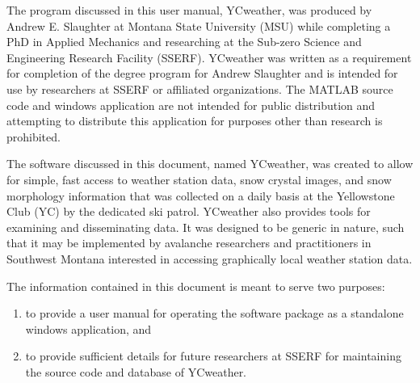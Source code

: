 The program discussed in this user manual, YCweather, was produced by Andrew E. Slaughter at Montana State University (MSU) while completing a PhD in Applied Mechanics and researching at the Sub-zero Science and Engineering Research Facility (SSERF). YCweather was written as a requirement for completion of the degree program for Andrew Slaughter and is intended for use by researchers at SSERF or affiliated organizations. The MATLAB source code and windows application are not intended for public distribution and attempting to distribute this application for purposes other than research is prohibited.

The software discussed in this document, named YCweather, was created to allow for simple, fast access to weather station data, snow crystal images, and snow morphology information that was collected on a daily basis at the Yellowstone Club (YC) by the dedicated ski patrol.  YCweather also provides tools for examining and disseminating data.  It was designed to be generic in nature, such that it may be implemented by avalanche researchers and practitioners in Southwest Montana interested in accessing graphically local weather station data.  

The information contained in this document is meant to serve two purposes:
\begin{enumerate}
\item to provide a user manual for operating the software package as a standalone windows application, and
\item to provide sufficient details for future researchers at SSERF for maintaining the source code and database of YCweather.
\end{enumerate}